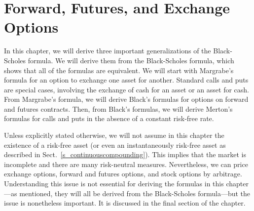 \chapter{Forward, Futures, and Exchange Options}\label{c_forwardexchange}

In this chapter, we will derive three important generalizations of the Black-Scholes formula.  We will derive them from the Black-Scholes formula, which shows that all of the formulas are equivalent.  We will start with Margrabe's \cite{Margrabe} formula for an option to exchange one asset for another.  Standard calls and puts are special cases, involving the exchange of cash for an asset or an asset for cash.  From Margrabe's formula, we will derive Black's \cite{Black} formulas for options on forward and futures contracts.  Then, from Black's formulas, we will derive Merton's \cite{Merton} formulas for calls and puts in the absence of a constant risk-free rate.  

Unless explicitly stated otherwise, we will not assume in this chapter the existence of a risk-free asset (or even an instantaneously risk-free asset as described in Sect.~\ref{s_continuouscompounding}).  This implies that the market is incomplete and there are many risk-neutral measures.  Nevertheless, we can price exchange options, forward and futures options, and stock options by arbitrage.  Understanding this issue is not essential for deriving the formulas in this chapter---as mentioned, they will all be derived from the Black-Scholes formula---but the issue is nonetheless important.  It is discussed in the final section of the chapter.

